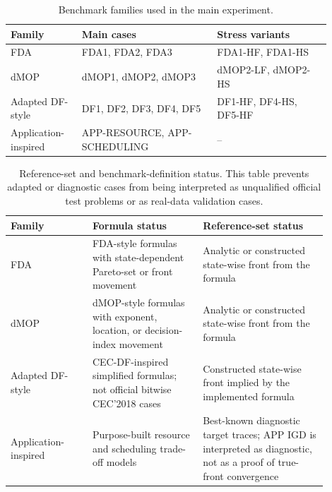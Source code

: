 \documentclass[1p,times]{elsarticle}
\begin{document}
\begin{table}[htbp]
\centering
\caption{Benchmark families used in the main experiment.}
\label{tab:benchmark-suite}
\small
\begin{tabular}{p{0.20\linewidth}p{0.38\linewidth}p{0.32\linewidth}}
\toprule
Family & Main cases & Stress variants \\
\midrule
FDA & FDA1, FDA2, FDA3 & FDA1-HF, FDA1-HS \\
dMOP & dMOP1, dMOP2, dMOP3 & dMOP2-LF, dMOP2-HS \\
Adapted DF-style & DF1, DF2, DF3, DF4, DF5 & DF1-HF, DF4-HS, DF5-HF \\
Application-inspired & APP-RESOURCE, APP-SCHEDULING & -- \\
\bottomrule
\end{tabular}
\end{table}


\begin{table}[htbp]
\centering
\caption{Reference-set and benchmark-definition status. This table prevents adapted or diagnostic cases from being interpreted as unqualified official test problems or as real-data validation cases.}
\label{tab:reference-status}
\small
\begin{tabular}{p{0.23\linewidth}p{0.31\linewidth}p{0.35\linewidth}}
\toprule
Family & Formula status & Reference-set status \\
\midrule
FDA & FDA-style formulas with state-dependent Pareto-set or front movement & Analytic or constructed state-wise front from the formula \\
dMOP & dMOP-style formulas with exponent, location, or decision-index movement & Analytic or constructed state-wise front from the formula \\
Adapted DF-style & CEC-DF-inspired simplified formulas; not official bitwise CEC'2018 cases & Constructed state-wise front implied by the implemented formula \\
Application-inspired & Purpose-built resource and scheduling trade-off models & Best-known diagnostic target traces; APP IGD is interpreted as diagnostic, not as a proof of true-front convergence \\
\bottomrule
\end{tabular}
\end{table}
\end{document}
